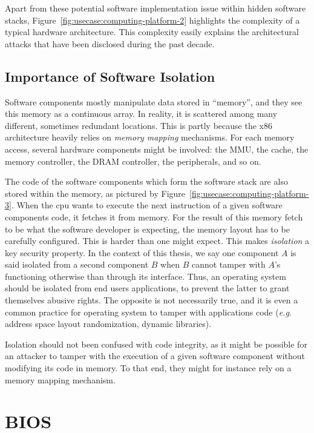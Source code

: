 Apart from these potential software implementation issue within hidden software
stacks, Figure~\ref{fig:usecase:computing-platform-2} highlights the complexity
of a typical hardware architecture.
%
This complexity easily explains the architectural attacks that have been
disclosed during the past decade.

\subsection{Importance of Software Isolation}

Software components mostly manipulate data stored in ``memory'', and they see
this memory as a continuous array.
%
In reality, it is scattered among many different, sometimes redundant locations.
%
This is partly because the x86 architecture heavily relies on \emph{memory
  mapping} mechanisms.
%
For each memory access, several hardware components might be involved: the MMU,
the cache, the memory controller, the DRAM controller, the peripherals, and so
on.

The code of the software components which form the software stack are also
stored within the memory, as pictured by
Figure~\ref{fig:usecase:computing-platform-3}.
%
When the \ac{cpu} wants to execute the next instruction of a given software
components code, it fetches it from memory.
%
For the result of this memory fetch to be what the software developer is
expecting, the memory layout has to be carefully configured.
%
This is harder than one might expect.
%
This makes \emph{isolation} a key security property.
%
In the context of this thesis, we say one component $A$ is said isolated from a
second component $B$ when $B$ cannot tamper with $A$'s functioning otherwise
than through its interface.
%
Thus, an operating system should be isolated from end users applications, to
prevent the latter to grant themselves abusive rights.
%
The opposite is not necessarily true, and it is even a common practice for
operating system to tamper with applications code (\emph{e.g.} address space
layout randomization, dynamic libraries).

Isolation should not been confused with code integrity, as it might be possible
for an attacker to tamper with the execution of a given software component
without modifying its code in memory.
%
To that end, they might for instance rely on a memory mapping mechanism.


\section{BIOS}
\label{sec:usecase:firmware}

